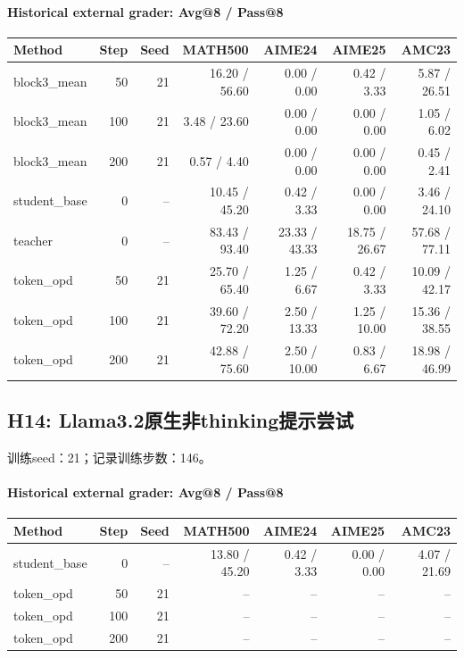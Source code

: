 \paragraph{Historical external grader: Avg@8 / Pass@8}
{\footnotesize\setlength{\tabcolsep}{3.5pt}
\begin{longtable}{@{}p{1.4in}rrrrrr@{}}
\toprule
Method & Step & Seed & MATH500 & AIME24 & AIME25 & AMC23 \\
\midrule\endhead
block3\_\allowbreak{}mean & 50 & 21 & 16.20 / 56.60 & 0.00 / 0.00 & 0.42 / 3.33 & 5.87 / 26.51 \\
block3\_\allowbreak{}mean & 100 & 21 & 3.48 / 23.60 & 0.00 / 0.00 & 0.00 / 0.00 & 1.05 / 6.02 \\
block3\_\allowbreak{}mean & 200 & 21 & 0.57 / 4.40 & 0.00 / 0.00 & 0.00 / 0.00 & 0.45 / 2.41 \\
student\_\allowbreak{}base & 0 & -- & 10.45 / 45.20 & 0.42 / 3.33 & 0.00 / 0.00 & 3.46 / 24.10 \\
teacher & 0 & -- & 83.43 / 93.40 & 23.33 / 43.33 & 18.75 / 26.67 & 57.68 / 77.11 \\
token\_\allowbreak{}opd & 50 & 21 & 25.70 / 65.40 & 1.25 / 6.67 & 0.42 / 3.33 & 10.09 / 42.17 \\
token\_\allowbreak{}opd & 100 & 21 & 39.60 / 72.20 & 2.50 / 13.33 & 1.25 / 10.00 & 15.36 / 38.55 \\
token\_\allowbreak{}opd & 200 & 21 & 42.88 / 75.60 & 2.50 / 10.00 & 0.83 / 6.67 & 18.98 / 46.99 \\
\bottomrule\end{longtable}
}
\subsection{H14: Llama3.2原生非thinking提示尝试}
\label{history:llama_native_stopped}
训练seed：21；记录训练步数：146。
\paragraph{Historical external grader: Avg@8 / Pass@8}
{\footnotesize\setlength{\tabcolsep}{3.5pt}
\begin{longtable}{@{}p{1.4in}rrrrrr@{}}
\toprule
Method & Step & Seed & MATH500 & AIME24 & AIME25 & AMC23 \\
\midrule\endhead
student\_\allowbreak{}base & 0 & -- & 13.80 / 45.20 & 0.42 / 3.33 & 0.00 / 0.00 & 4.07 / 21.69 \\
token\_\allowbreak{}opd & 50 & 21 & -- & -- & -- & -- \\
token\_\allowbreak{}opd & 100 & 21 & -- & -- & -- & -- \\
token\_\allowbreak{}opd & 200 & 21 & -- & -- & -- & -- \\
\bottomrule\end{longtable}
}
